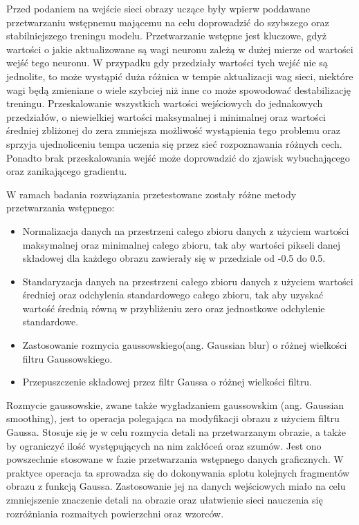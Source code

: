   Przed podaniem na wejście sieci obrazy uczące były wpierw poddawane
  przetwarzaniu wstępnemu mającemu na celu doprowadzić do szybszego oraz
  stabilniejszego treningu modelu. Przetwarzanie wstępne jest kluczowe, gdyż
  wartości o jakie aktualizowane są wagi neuronu zależą w dużej mierze od
  wartości wejść tego neuronu. W przypadku gdy przedziały wartości tych wejść
  nie są jednolite, to może wystąpić duża różnica w tempie aktualizacji wag
  sieci, niektóre wagi będą zmieniane o wiele szybciej niż inne co może spowodować
  destabilizację treningu. Przeskalowanie wszystkich wartości wejściowych do jednakowych
  przedziałów, o niewielkiej wartości maksymalnej i minimalnej oraz wartości
  średniej zbliżonej do zera zmniejsza możliwość wystąpienia tego problemu
  oraz sprzyja ujednoliceniu tempa uczenia się przez sieć rozpoznawania różnych cech.
  Ponadto brak przeskalowania wejść może doprowadzić do zjawisk wybuchającego
  oraz zanikającego gradientu.

  \noindent
  W ramach badania rozwiązania przetestowane zostały różne metody przetwarzania
  wstępnego:
  \begin{itemize}
  \item Normalizacja danych na przestrzeni całego zbioru danych z użyciem wartości
  maksymalnej oraz minimalnej całego zbioru, tak aby wartości pikseli danej składowej
  dla każdego obrazu zawierały się w przedziale od -0.5 do 0.5.
  \item Standaryzacja danych na przestrzeni całego zbioru danych z użyciem wartości
  średniej oraz odchylenia standardowego całego zbioru, tak aby uzyskać wartość
  średnią równą w przybliżeniu zero oraz jednostkowe odchylenie standardowe.
  \item Zastosowanie rozmycia gaussowskiego(ang. Gaussian blur) o różnej
  wielkości filtru Gaussowskiego.
  \item Przepuszczenie składowej przez filtr Gaussa o różnej wielkości filtru.
  \end{itemize}

  Rozmycie gaussowskie, zwane także wygładzaniem gaussowskim (ang. Gaussian smoothing),
  jest to operacja polegająca na modyfikacji obrazu z użyciem filtru Gaussa.
  Stosuje się je w celu rozmycia detali na przetwarzanym obrazie, a także by
  ograniczyć ilość występujących na nim zakłóceń oraz szumów. Jest ono powszechnie
  stosowane w fazie przetwarzania wstępnego danych graficznych. W praktyce
  operacja ta sprowadza się do dokonywania splotu kolejnych fragmentów obrazu
  z funkcją Gaussa. Zastosowanie jej na danych wejściowych miało na celu
  zmniejszenie znaczenie detali na obrazie oraz ułatwienie sieci nauczenia się
  rozróżniania rozmaitych powierzchni oraz wzorców.


